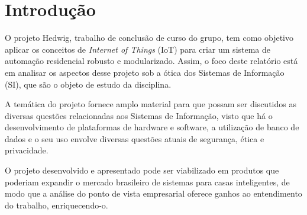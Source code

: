 \chapter{Introdução}

O projeto Hedwig, trabalho de conclusão de curso do grupo, tem como objetivo aplicar os conceitos de \emph{Internet of Things} (IoT) para criar um sistema de automação residencial robusto e modularizado. Assim, o foco deste relatório está em analisar os aspectos desse projeto sob a ótica dos Sistemas de Informação (SI), que são o objeto de estudo da disciplina.

A temática do projeto fornece amplo material para que possam ser discutidos as diversas questões relacionadas aos Sistemas de Informação, visto que há o desenvolvimento de plataformas de hardware e software, a utilização de banco de dados e o seu uso envolve diversas questões atuais de segurança, ética e privacidade.

O projeto desenvolvido e apresentado pode ser viabilizado em produtos que poderiam expandir o mercado brasileiro de sistemas para casas inteligentes, de modo que a análise do ponto de vista empresarial oferece ganhos ao entendimento do trabalho, enriquecendo-o.

